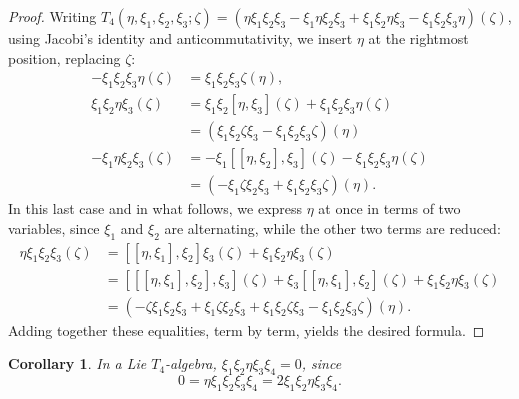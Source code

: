 \documentclass[a4paper]{article}
\newtheorem*{corollary*}{Corollary}
\begin{document}
\begin{proof}
	Writing $T_4\left(\eta, \xi_1, \xi_2, \xi_3 ; \zeta\right)=(\eta \xi_1 \xi_2 \xi_3-\xi_1 \eta \xi_2 \xi_3+\xi_1 \xi_2 \eta \xi_3-\xi_1 \xi_2 \xi_3 \eta)(\zeta)$, using Jacobi's identity and anticommutativity, we insert $\eta$ at the rightmost position, replacing $\zeta$:
	\begin{equation*}
		\begin{aligned}
			-\xi_1 \xi_2 \xi_3 \eta(\zeta) & =\xi_1 \xi_2 \xi_3 \zeta(\eta), \\
			\xi_1 \xi_2 \eta \xi_3(\zeta) & =\xi_1 \xi_2[\eta, \xi_3](\zeta)+\xi_1 \xi_2 \xi_3 \eta(\zeta) \\
			& =(\xi_1 \xi_2 \zeta \xi_3-\xi_1 \xi_2 \xi_3 \zeta)(\eta) \\
			-\xi_1 \eta \xi_2 \xi_3(\zeta) & =-\xi_1[[\eta, \xi_2], \xi_3](\zeta)-\xi_1 \xi_2 \xi_3 \eta(\zeta) \\
			& =(-\xi_1 \zeta \xi_2 \xi_3+\xi_1 \xi_2 \xi_3 \zeta)(\eta) .
		\end{aligned}
	\end{equation*}
	In this last case and in what follows, we express $\eta$ at once in terms of two variables, since $\xi_1$ and $\xi_2$ are alternating, while the other two terms are reduced:
	\begin{equation*}
		\begin{aligned}
			\eta \xi_1 \xi_2 \xi_3(\zeta) & =[[\eta, \xi_1], \xi_2] \xi_3(\zeta)+\xi_1 \xi_2 \eta \xi_3(\zeta) \\
			& =[[[\eta, \xi_1], \xi_2], \xi_3](\zeta)+\xi_3[[\eta, \xi_1], \xi_2](\zeta)+\xi_1 \xi_2 \eta \xi_3(\zeta) \\
			& =(-\zeta \xi_1 \xi_2 \xi_3+\xi_1 \zeta \xi_2 \xi_3+\xi_1 \xi_2 \zeta \xi_3-\xi_1 \xi_2 \xi_3 \zeta)(\eta) .
		\end{aligned}
	\end{equation*}
	Adding together these equalities, term by term, yields the desired formula.
\end{proof}

\begin{corollary*}
	In a Lie $T_4$-algebra, $\xi_1 \xi_2 \eta \xi_3 \xi_4=0$, since
	\begin{equation}
		\label{eq:10}
		0=\eta \xi_1 \xi_2 \xi_3 \xi_4=2 \xi_1 \xi_2 \eta \xi_3 \xi_4.
	\end{equation}
\end{corollary*}
\end{document}
